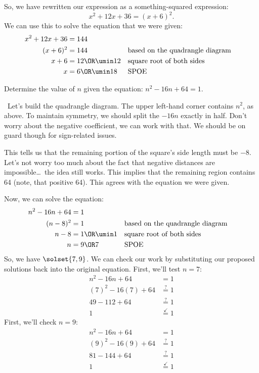 
So, we have rewritten our expression as a something-squared expression:
\[x^2 + 12x + 36 = (x+6)^2.\]
We can use this to solve the equation that we were given:
\begin{align*}
x^2 + 12x + 36 &= 144
\\
(x+6)^2 &= 144
&&\text{based on the quadrangle diagram}
\\
x+6 &= 12 \OR \umin12
&&\text{square root of both sides}
\\
x &= 6 \OR \umin18
&&\text{SPOE}
\end{align*}

\begin{boxedex}
Determine the value of $n$ given the equation: $n^2 - 16n + 64 = 1$.

\exsoln\ Let's build the quadrangle diagram. The upper left-hand corner contains $n^2$, as above. To maintain symmetry, we should split the $-16n$ exactly in half. Don't worry about the negative coefficient, we can work with that. We should be on guard though for sign-related issues.


This tells us that the remaining portion of the square's side length must be $-8$. Let's not worry too much about the fact that negative distances are impossible\ldots\ the idea still works. This implies that the remaining region contains 64 (note, that positive 64). This agrees with the equation we were given.


Now, we can solve the equation:
\begin{align*}
n^2 -16n +64 &= 1
\\
(n-8)^2 &= 1
&&\text{based on the quadrangle diagram}
\\
n-8 &= 1 \OR \umin1
&&\text{square root of both sides}
\\
n &= 9 \OR 7
&&\text{SPOE}
\end{align*}
So, we have $\solset{7,9}$. We can check our work by substituting our proposed solutions back into the original equation. First, we'll test $n=7$:
\begin{align*}
n^2 -16n +64 &= 1
\\
(7)^2 - 16(7) + 64 &\overset{?}{=} 1
\\
49 - 112 + 64 &\overset{?}{=} 1
\\
1 &\overset{\checkmark}{=} 1
\end{align*}
First, we'll check $n=9$:
\begin{align*}
n^2 -16n +64 &= 1
\\
(9)^2 - 16(9) + 64 &\overset{?}{=} 1
\\
81 - 144 + 64 &\overset{?}{=} 1
\\
1 &\overset{\checkmark}{=} 1
\end{align*}
\end{boxedex}

